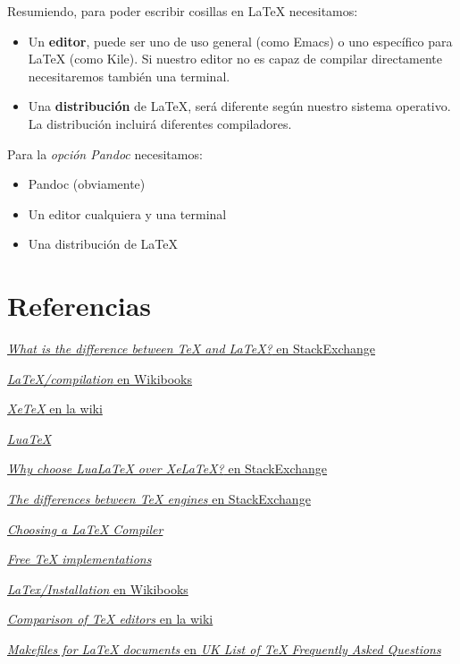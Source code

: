 Resumiendo, para poder escribir cosillas en LaTeX necesitamos:

\begin{itemize}
\item
  Un \textbf{editor}, puede ser uno de uso general (como Emacs) o uno
  específico para LaTeX (como Kile). Si nuestro editor no es capaz de
  compilar directamente necesitaremos también una terminal.
\item
  Una \textbf{distribución} de LaTeX, será diferente según nuestro
  sistema operativo. La distribución incluirá diferentes compiladores.
\end{itemize}

Para la \emph{opción Pandoc} necesitamos:

\begin{itemize}
\item
  Pandoc (obviamente)
\item
  Un editor cualquiera y una terminal
\item
  Una distribución de LaTeX
\end{itemize}

\section{Referencias}\label{referencias}

\href{http://tex.stackexchange.com/questions/49/what-is-the-difference-between-tex-and-latex}{\emph{What
is the difference between TeX and LaTeX?} en StackExchange}

\href{https://en.wikibooks.org/wiki/LaTeX/Basics\#Compilation}{\emph{LaTeX/compilation}
en Wikibooks}

\href{https://en.wikipedia.org/wiki/XeTeX}{\emph{XeTeX} en la wiki}

\href{http://www.luatex.org/}{\emph{LuaTeX}}

\href{http://tex.stackexchange.com/questions/126206/why-choose-lualatex-over-xelatex\#126216}{\emph{Why
choose LuaLaTeX over XeLaTeX?} en StackExchange}

\href{http://tex.stackexchange.com/questions/13593/the-differences-between-tex-engines\#13601}{\emph{The
differences between TeX engines} en StackExchange}

\href{https://www.sharelatex.com/learn/Choosing_a_LaTeX_Compiler}{\emph{Choosing
a LaTeX Compiler}}

\href{http://www.tug.org/interest.html\#free}{\emph{Free TeX
implementations}}

\href{https://en.wikibooks.org/wiki/LaTeX/Installation}{\emph{LaTex/Installation}
en Wikibooks}

\href{https://en.wikipedia.org/wiki/Comparison_of_TeX_editors}{\emph{Comparison
of TeX editors} en la wiki}

\href{http://www.tex.ac.uk/FAQ-make.html}{\emph{Makefiles for LaTeX
documents} en \emph{UK List of TeX Frequently Asked Questions}}
